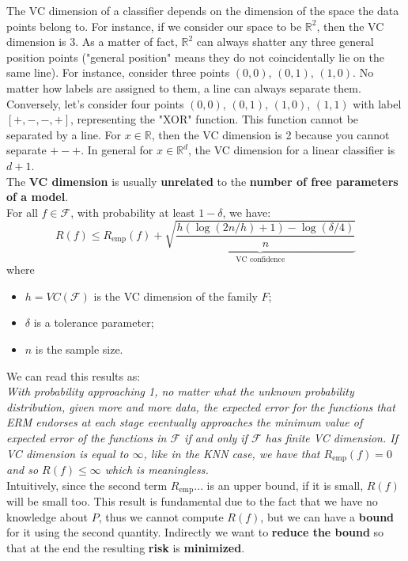 The VC dimension of a classifier depends on the dimension of the space the data points belong to. For instance, if we consider our space to be $\mathbb{R}^2$, then the VC dimension is $3$. As a matter of fact,  $\mathbb{R}^2$ can always shatter any three general position points ("general position" means they do not coincidentally lie on the same line). For instance, consider three points $(0,0)$, $(0,1)$, $(1,0)$. No matter how labels are assigned to them, a line can always separate them. Conversely, let's consider four points $(0,0)$, $(0,1)$, $(1,0)$, $(1,1)$ with label $[+,-,-,+]$, representing the "XOR" function. This function cannot be separated by a line. For $x\in\mathbb{R}$, then the VC dimension is 2 because you cannot separate $+-+$. In general for $x\in\mathbb{R}^d$, the VC dimension for a linear classifier is $d+1$.\\

The \textbf{VC dimension} is usually \textbf{unrelated} to the \textbf{number of free parameters of a model}.\\
For all $f \in \mathcal{ F }$, with probability at least $1-\delta$, we have:
$$
R ( f ) \leq R _ { \mathrm { emp } } ( f ) + \underbrace{\sqrt { \frac { h ( \log ( 2 n / h ) + 1 ) - \log ( \delta / 4 ) } { n } }}_{\text{VC confidence}}
$$
where 

\begin{itemize}
    \item $h=VC(\mathcal{ F })$ is the VC dimension of the family $F$;
    \item $\delta$ is a tolerance parameter;
    \item $n$ is the sample size.
\end{itemize}

We can read this results as:\\

\textit{With probability approaching  1, no matter what the unknown probability distribution, given more and more data, the expected error for the functions that ERM endorses at each stage eventually approaches the minimum value of expected error of the functions in $\mathcal{ F }$ if and only if $\mathcal{ F }$ has finite VC dimension. If VC dimension is equal to $\infty$, like in the KNN case, we have that $R_\text{emp}(f) = 0$ and so $R(f) \leq \infty$ which is meaningless.}\\

Intuitively, since the second term $R_\text{emp}\dots$ is an upper bound, if it is small, $R(f)$ will be small too. This result is fundamental due to the fact that we have no knowledge about $P$, thus we cannot compute $R(f)$, but we can have a \textbf{bound} for it using the second quantity. Indirectly we want to \textbf{reduce the bound} so that at the end the resulting \textbf{risk} is \textbf{minimized}.

